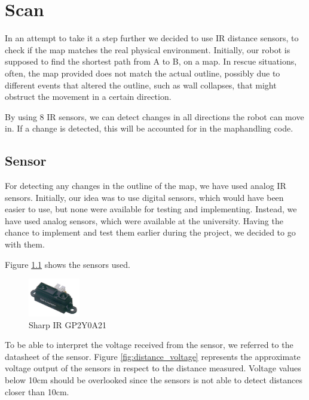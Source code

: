 \chapter{Scan}\label{ch:scan}
In an attempt to take it a step further we decided to use IR distance sensors,
to check if the map matches the real physical environment.
Initially, our robot is supposed to find the 
shortest path from A to B, on a map. 
In rescue situations, often, the map provided does not match 
the actual outline, possibly due to different events that 
altered the outline, such as wall collapses, that might 
obstruct the movement in a certain direction.

By using 8 IR sensors, we can detect changes in all directions 
the robot can move in. If a change is detected, this will be
accounted for in the maphandling code.

\newpage
\section{Sensor}\label{sec:sensor}
For detecting any changes in the outline of the map, we have used analog IR 
sensors. Initially, our idea was to use digital sensors, which would have been 
easier to use, but none were available for testing and implementing. Instead, 
we have used analog sensors, which were available at the university. Having the 
chance to implement and test them earlier during the project, we decided to go 
with them. 

Figure \ref{fig:sensor} shows the sensors used.

\begin{figure}[htp]
	\centering
	\includegraphics[width=0.2\textwidth]{figures/scan/Sensor.png}
	\caption{Sharp IR GP2Y0A21}
	\label{fig:sensor}
\end{figure}

To be able to interpret the voltage received from the sensor, we referred 
to the datasheet of the sensor. Figure \ref{fig:distance_voltage} represents
the approximate voltage output of the sensors in respect to the distance measured.
Voltage values below 10cm should be overlooked since the sensors is not able
to detect distances closer than 10cm.

